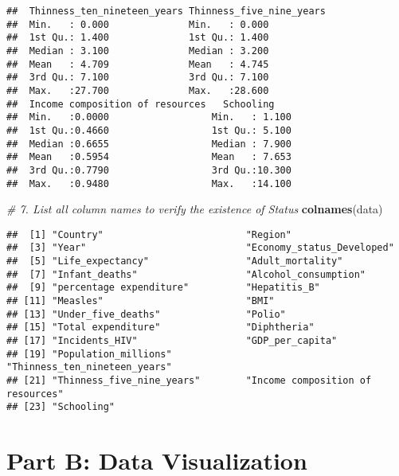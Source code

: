\documentclass[
]{article}
\newenvironment{Shaded}{\begin{snugshade}}{\end{snugshade}}
\newcommand{\CommentTok}[1]{\textcolor[rgb]{0.56,0.35,0.01}{\textit{#1}}}
\newcommand{\FunctionTok}[1]{\textcolor[rgb]{0.13,0.29,0.53}{\textbf{#1}}}
\newcommand{\NormalTok}[1]{#1}
\begin{document}
\begin{verbatim}
##  Thinness_ten_nineteen_years Thinness_five_nine_years
##  Min.   : 0.000              Min.   : 0.000          
##  1st Qu.: 1.400              1st Qu.: 1.400          
##  Median : 3.100              Median : 3.200          
##  Mean   : 4.709              Mean   : 4.745          
##  3rd Qu.: 7.100              3rd Qu.: 7.100          
##  Max.   :27.700              Max.   :28.600          
##  Income composition of resources   Schooling     
##  Min.   :0.0000                  Min.   : 1.100  
##  1st Qu.:0.4660                  1st Qu.: 5.100  
##  Median :0.6655                  Median : 7.900  
##  Mean   :0.5954                  Mean   : 7.653  
##  3rd Qu.:0.7790                  3rd Qu.:10.300  
##  Max.   :0.9480                  Max.   :14.100
\end{verbatim}

\begin{Shaded}
\begin{Highlighting}[]
\CommentTok{\# 7. List all column names to verify the existence of \textquotesingle{}Status\textquotesingle{}}
\FunctionTok{colnames}\NormalTok{(data)}
\end{Highlighting}
\end{Shaded}

\begin{verbatim}
##  [1] "Country"                         "Region"                         
##  [3] "Year"                            "Economy_status_Developed"       
##  [5] "Life_expectancy"                 "Adult_mortality"                
##  [7] "Infant_deaths"                   "Alcohol_consumption"            
##  [9] "percentage expenditure"          "Hepatitis_B"                    
## [11] "Measles"                         "BMI"                            
## [13] "Under_five_deaths"               "Polio"                          
## [15] "Total expenditure"               "Diphtheria"                     
## [17] "Incidents_HIV"                   "GDP_per_capita"                 
## [19] "Population_millions"             "Thinness_ten_nineteen_years"    
## [21] "Thinness_five_nine_years"        "Income composition of resources"
## [23] "Schooling"
\end{verbatim}

\hypertarget{part-b-data-visualization}{%
\section{Part B: Data Visualization}\label{part-b-data-visualization}}
\end{document}
